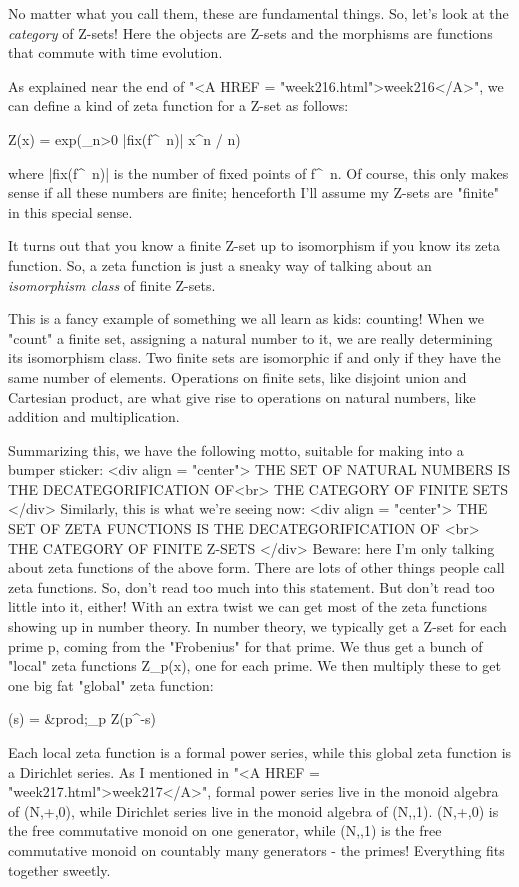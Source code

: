 No matter what you call them, these are fundamental things.  So, let's 
look at the \emph{category} of Z-sets!  Here the objects are Z-sets and the 
morphisms are functions that commute with time evolution.  

As explained near the end of "<A HREF =
"week216.html">week216</A>", we can define a kind of zeta
function for a Z-set as follows:

Z(x) = exp(\sum_{n>0} |fix(f^{\ n})| x^{n} / n)

where |fix(f^{\ n})| is the number of fixed points of 
f^{\ n}.  Of course, this
only makes sense if all these numbers are finite; henceforth I'll assume 
my Z-sets are "finite" in this special sense.  

It turns out that you know a finite Z-set up to isomorphism if you know its 
zeta function.  So, a zeta function is just a sneaky way of talking about 
an \emph{isomorphism class} of finite Z-sets.  


This is a fancy example of something we all learn as kids: counting!
When we "count" a finite set, assigning a natural number to
it, we are really determining its isomorphism class.  Two finite sets
are isomorphic if and only if they have the same number of elements.
Operations on finite sets, like disjoint union and Cartesian product,
are what give rise to operations on natural numbers, like addition and
multiplication.

Summarizing this, we have the following motto, suitable for making into
a bumper sticker:
<div align = "center">
  THE SET OF NATURAL NUMBERS IS THE DECATEGORIFICATION OF<br>
                THE CATEGORY OF FINITE SETS
</div>
Similarly, this is what we're seeing now:
<div align = "center">
  THE SET OF ZETA FUNCTIONS IS THE DECATEGORIFICATION OF  <br>
               THE CATEGORY OF FINITE Z-SETS
</div>
Beware: here I'm only talking about zeta functions of the above form.  There 
are lots of other things people call zeta functions.   So, don't read too 
much into this statement.  But don't read too little into it, either!   With 
an extra twist we can get most of the zeta functions showing up in number 
theory.  In number theory, we typically get a Z-set for each prime p, 
coming from the "Frobenius" for that prime.  We thus get a bunch of "local" 
zeta functions Z_{p}(x), one for each prime.  We then multiply these to get 
one big fat "global" zeta function:

\zeta (s) = &prod;_{p} Z(p^{-s})

Each local zeta function is a formal power series, while this global
zeta function is a Dirichlet series.  As I mentioned in "<A HREF
= "week217.html">week217</A>", formal power series live in the
monoid algebra of (N,+,0), while Dirichlet series live in the monoid
algebra of (N,\times ,1).  (N,+,0) is the free commutative monoid on one
generator, while (N,\times ,1) is the free commutative monoid on countably
many generators - the primes!  Everything fits together sweetly.

